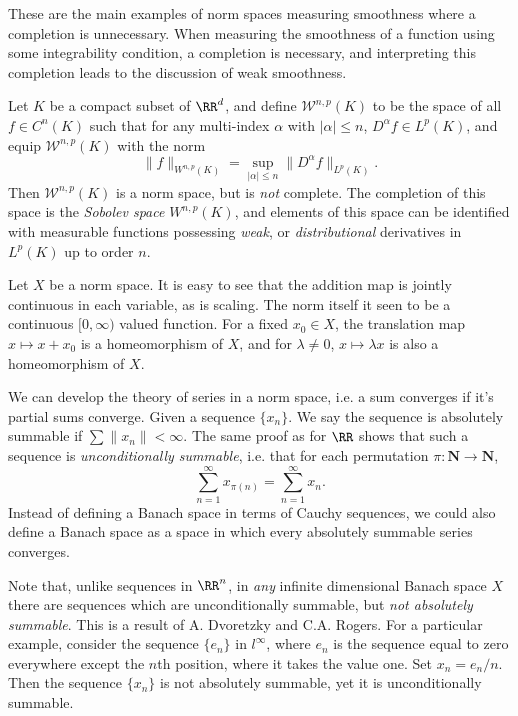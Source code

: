 These are the main examples of norm spaces measuring smoothness where a completion is unnecessary. When measuring the smoothness of a function using some integrability condition, a completion is necessary, and interpreting this completion leads to the discussion of weak smoothness.

\begin{example}
    Let $K$ be a compact subset of $\RR^d$, and define $\mathcal{W}^{n,p}(K)$ to be the space of all $f \in C^n(K)$ such that for any multi-index $\alpha$ with $|\alpha| \leq n$, $D^\alpha f \in L^p(K)$, and equip $\mathcal{W}^{n,p}(K)$ with the norm
    \[ \| f \|_{W^{n,p}(K)} = \sup_{|\alpha| \leq n} \| D^\alpha f \|_{L^p(K)}. \]
    Then $\mathcal{W}^{n,p}(K)$ is a norm space, but is \emph{not} complete. The completion of this space is the \emph{Sobolev space} $W^{n,p}(K)$, and elements of this space can be identified with measurable functions possessing \emph{weak}, or \emph{distributional} derivatives in $L^p(K)$ up to order $n$.
\end{example}

Let $X$ be a norm space. It is easy to see that the addition map is jointly continuous in each variable, as is scaling. The norm itself it seen to be a continuous $[0,\infty)$ valued function. For a fixed $x_0 \in X$, the translation map $x \mapsto x + x_0$ is a homeomorphism of $X$, and for $\lambda \neq 0$, $x \mapsto \lambda x$ is also a homeomorphism of $X$.

We can develop the theory of series in a norm space, i.e. a sum converges if it's partial sums converge. Given a sequence $\{ x_n \}$. We say the sequence is absolutely summable if $\sum \| x_n \| < \infty$. The same proof as for $\RR$ shows that such a sequence is {\it unconditionally summable}, i.e. that for each permutation $\pi: \mathbf{N} \to \mathbf{N}$,
%
\[ \sum_{n = 1}^\infty x_{\pi(n)} = \sum_{n = 1}^\infty x_n. \]
%
Instead of defining a Banach space in terms of Cauchy sequences, we could also define a Banach space as a space in which every absolutely summable series converges.

\begin{remark}
    Note that, unlike sequences in $\RR^n$, in \emph{any} infinite dimensional Banach space $X$ there are sequences which are unconditionally summable, but \emph{not absolutely summable}. This is a result of A. Dvoretzky and C.A. Rogers. For a particular example, consider the sequence $\{ e_n \}$ in $l^\infty$, where $e_n$ is the sequence equal to zero everywhere except the $n$th position, where it takes the value one. Set $x_n = e_n / n$. Then the sequence $\{ x_n \}$ is not absolutely summable, yet it is unconditionally summable.
\end{remark}

